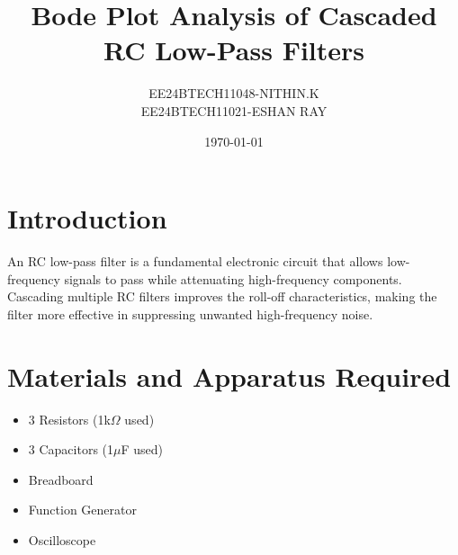\documentclass{article}
\title{Bode Plot Analysis of Cascaded RC Low-Pass Filters}
\author{EE24BTECH11048-NITHIN.K\\EE24BTECH11021-ESHAN RAY}
\date{\today}
\begin{document}
\maketitle

\section{Introduction}
An RC low-pass filter is a fundamental electronic circuit that allows low-frequency signals to pass while attenuating high-frequency components. Cascading multiple RC filters improves the roll-off characteristics, making the filter more effective in suppressing unwanted high-frequency noise.
\section{Materials and Apparatus Required}
\begin{itemize}
    \item 3 Resistors (1k$\Omega$ used)
    \item 3 Capacitors (1$\mu$F used)
    \item Breadboard
    \item Function Generator
    \item Oscilloscope
\end{itemize}
\end{document}
